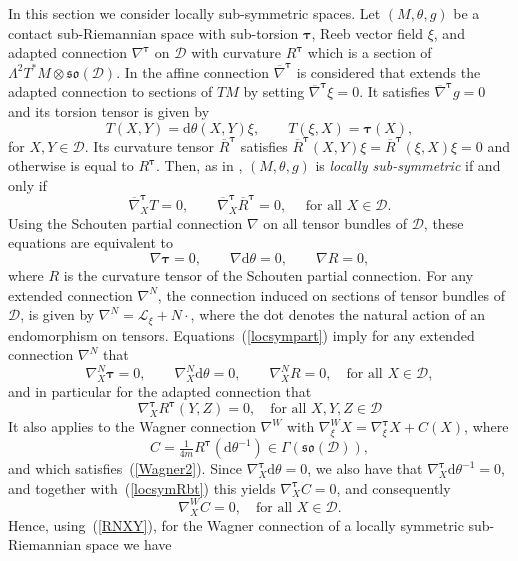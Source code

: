 \documentclass{amsart}
\theoremstyle{plain}
\theoremstyle{definition}
\def\so{\mathfrak{so}}
\newcommand{\bt}{{\boldsymbol{\tau}}}
\newcommand{\1}{\mathbf{1}}
\newcommand{\D}{{\mathcal D}}
\renewcommand{\d}{\mathrm{d}}
\renewcommand{\L}{{\mathcal L}}
\newcommand{\+}{\oplus}
\newcommand{\nbt}{\nabla^\bt}
\newcommand{\Rbt}{R^\bt}
\newcommand{\nbbt}{\overline{\nabla}^\bt}
\newcommand{\Rbbt}{\overline{R}^\bt}
\begin{document}
In this section we consider locally sub-symmetric spaces.
Let $(M,\theta, g)$ be a contact 
  sub-Riemannian space with sub-torsion $\bt$, Reeb vector field $\xi$, and adapted connection $\nbt$ on $\D$ with curvature $\Rbt$ which is a section of $\Lambda^2T^*M\otimes \so(\D)$. In \cite{FG} the affine connection $\nbbt$ is considered that extends the adapted connection to sections of $TM$ by setting $\nbbt\xi=0$. It satisfies $\nbbt g=0$ and its torsion tensor is given by
  \[T(X,Y)=\d\theta (X,Y)\xi,\qquad T(\xi ,X)=\bt(X),\]
  for $X,Y\in \D$.
 Its curvature tensor $\Rbbt$ satisfies $\Rbbt(X,Y)\xi=\Rbbt(\xi,X)\xi =0$ and otherwise is equal to $\Rbt$.
 Then, as in \cite{FG}, $(M,\theta, g)$ is {\em locally sub-symmetric}  if and only if
 \begin{equation}
 \label{FGlocsym}\nbbt_X T=0,\qquad \nbbt_X  \Rbbt =0,\quad\text{ for all }X\in \D.\end{equation}
Using the   Schouten partial connection $\nabla$  on all tensor bundles of $\D$,  these equations are equivalent to
\begin{equation} 
\label{locsympart}
\nabla \bt=0,\qquad \nabla \d\theta=0,\qquad \nabla  R =0,
\end{equation}
where $R$ is the curvature tensor of the Schouten partial connection. For any extended connection $\nabla^N$, the connection induced on sections of tensor bundles of $\D$, is given by $\nabla^N=\L_\xi+ N\cdot$, where the dot denotes the natural action of an endomorphism on tensors. 
Equations~(\ref{locsympart}) imply for any extended connection $\nabla^N$  that
\begin{equation} 
\label{locsymN}
\nabla^N_X \bt=0,\qquad \nabla^N_X \d\theta=0,\qquad \nabla^N_X R =0,\quad \text{for all }X\in\D,
\end{equation}
and in particular for the adapted connection that 
\begin{equation}
\label{locsymRbt}
\nbt_X R^\bt(Y,Z)=0,\quad \text{for all }X,Y,Z\in\D
\end{equation}
It also applies to the Wagner connection $\nabla^W$ with $\nabla^W_\xi X=\nabla^\bt_\xi X+C(X)$, where \[C=\tfrac{1}{4m} R^\bt(\d\theta^{-1})\in \Gamma(\so(\D)),\] and which satisfies~(\ref{Wagner2}). Since $\nbt_X\d\theta=0$, we also have that $\nbt_X\d\theta^{-1}=0$, and together with~(\ref{locsymRbt}) this yields  $\nbt_XC =0$, and consequently
\begin{equation}
\label{nabWC}
\nabla^W_XC=0,\quad \text{for all }X\in\D.
\end{equation}
Hence, using~(\ref{RNXY}), for the Wagner connection of a locally symmetric sub-Riemannian space we have 
\end{document}
